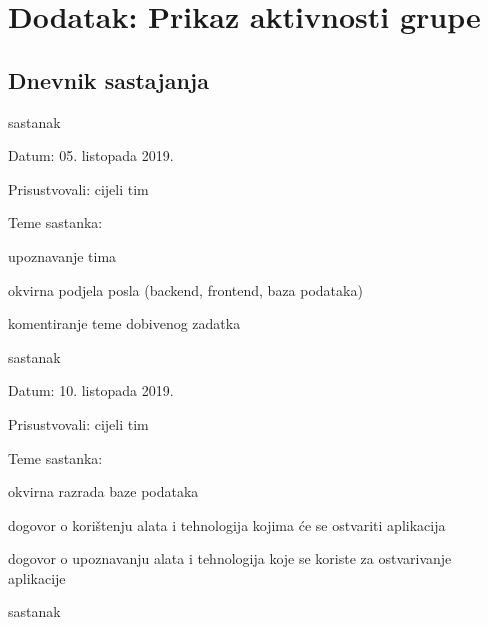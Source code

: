 \chapter*{Dodatak: Prikaz aktivnosti grupe}
		
		\section*{Dnevnik sastajanja}
		
		
		\begin{packed_enum}
			\item  sastanak
			
			\item[] \begin{packed_item}
				\item Datum: 05. listopada 2019.
				\item Prisustvovali: cijeli tim
				\item Teme sastanka:
				\begin{packed_item}
					\item upoznavanje tima
					\item okvirna podjela posla (backend, frontend, baza podataka)
					\item komentiranje teme dobivenog zadatka
				\end{packed_item}
			\end{packed_item}
			
			\item  sastanak
			\item[] \begin{packed_item}
				\item Datum: 10. listopada 2019.
				\item Prisustvovali: cijeli tim
				\item Teme sastanka:
				\begin{packed_item}
					\item okvirna razrada baze podataka
					\item dogovor o korištenju alata i tehnologija kojima će se ostvariti aplikacija
					\item dogovor o upoznavanju alata i tehnologija koje se koriste za ostvarivanje aplikacije
				\end{packed_item}
			\end{packed_item}
		
			\item  sastanak
			

\end{packed_enum}
